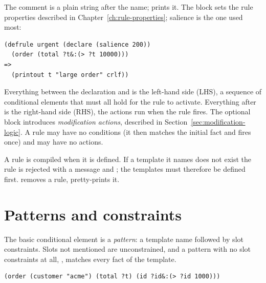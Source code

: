 The comment is a plain string after the name;  prints it. The
 block sets the rule properties described in
Chapter~\ref{ch:rule-properties}; salience is the one used most:

\begin{lstlisting}
(defrule urgent (declare (salience 200))
  (order (total ?t&:(> ?t 10000)))
=>
  (printout t "large order" crlf))
\end{lstlisting}

Everything between the declaration and \fn{=>} is the left-hand side
(LHS), a sequence of conditional elements that must all hold for the rule
to activate. Everything after \fn{=>} is the right-hand side (RHS), the
actions run when the rule fires. The optional \fn{<<=} block introduces
\emph{modification actions}, described in
Section~\ref{sec:modification-logic}. A rule may have no conditions (it
then matches the initial fact and fires once) and may have no actions.

A rule is compiled when it is defined. If a template it names does not
exist the rule is rejected with a message and ; the templates
must therefore be defined first.  removes a rule,
 pretty-prints it.

\section{Patterns and constraints}
\label{sec:patterns}

The basic conditional element is a \emph{pattern}: a template name
followed by slot constraints. Slots not mentioned are unconstrained, and
a pattern with no slot constraints at all, , matches every
fact of the template.

\begin{lstlisting}
(order (customer "acme") (total ?t) (id ?id&:(> ?id 1000)))
\end{lstlisting}

